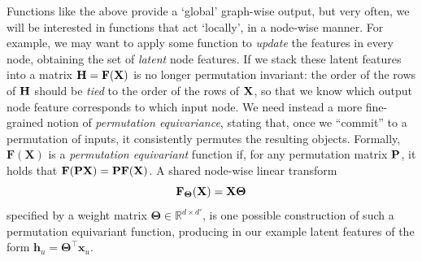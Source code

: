 Functions like the above provide a `global' graph-wise output, but very often, we will be interested in functions that act `locally', in a node-wise manner. 
For example, we may want to apply some function to \emph{update} the features in every node, obtaining the set of \emph{latent} node features. 
%
If we stack these latent features into a matrix $\mathbf{H} = \mathbf{F}({\bf X})$ is no longer permutation invariant: the order of the rows of ${\bf H}$ should be \emph{tied} to the order of the rows of ${\bf X}$, so that we know which output node feature corresponds to which input node. We need instead  a more fine-grained notion of {\em permutation equivariance}, stating that, once we ``commit'' to a permutation of inputs, it consistently permutes the resulting objects. 
%
Formally, $\mathbf{F}(\mathbf{X})$ is a \emph{permutation equivariant} function if, for any permutation matrix ${\bf P}$, it holds that $\mathbf{F}({\bf P}{\bf X}) = {\bf P}\mathbf{F}({\bf X})$. A shared node-wise linear transform 
\begin{equation}
    \mathbf{F}_{\mathbf\Theta}({\bf X}) = {\bf X}{\mathbf \Theta}
\end{equation}
specified by a weight matrix $\mathbf\Theta\in\mathbb{R}^{d\times d'}$, is one possible construction of such a permutation equivariant function, producing in our example 
latent features of the form 
$\mathbf{h}_u = \boldsymbol{\Theta}^\top\mathbf{x}_u$.



